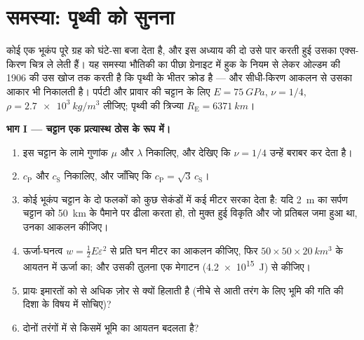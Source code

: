 \section{समस्या: पृथ्वी को सुनना}

\begin{problem}[{सप्ताहांत समस्या --- भूकंपों ने द्रव क्रोड कैसे
उजागर किया}]\label{pb:b3:continuum-elasticity:1}
कोई एक भूकंप पूरे ग्रह को घंटे-सा बजा देता है, और इस अध्याय की दो
 उसे पार करती हुई उसका एक्स-किरण चित्र ले लेती हैं।
यह समस्या भौतिकी का पीछा ग्रेनाइट में हुक के नियम से लेकर ओल्डम की
1906 की उस खोज तक करती है कि पृथ्वी के भीतर क्रोड है --- और सीधी-किरण
आकलन से उसका आकार भी निकालती है। पर्पटी और प्रावार की चट्टान के लिए
$E = \qty{75}{GPa}$, $\nu = 1/4$,
$\rho = \qty{2.7e3}{kg/m^3}$ लीजिए; पृथ्वी की त्रिज्या $R_{\text{E}} =
\qty{6371}{km}$।

\medskip\noindent\textbf{भाग I --- चट्टान एक प्रत्यास्थ ठोस के रूप में।}
\begin{enumerate}
  \item इस चट्टान के लामे गुणांक $\mu$ और $\lambda$ निकालिए, और
        देखिए कि $\nu = 1/4$ उन्हें बराबर कर देता है।
  \item $c_{\text{P}}$ और $c_{\text{S}}$ निकालिए, और जाँचिए कि
        $c_{\text{P}} = \sqrt3\,c_{\text{S}}$।
  \item कोई भूकंप चट्टान के दो फलकों को कुछ सेकंडों में कई मीटर सरका
        देता है: यदि \qty{2}{m} का सर्पण चट्टान को \qty{50}{km} के
        पैमाने पर ढीला करता हो, तो मुक्त हुई विकृति और जो प्रतिबल जमा
        हुआ था, उनका आकलन कीजिए।
  \item ऊर्जा-घनत्व $w = \tfrac12 E\varepsilon^2$ से प्रति घन मीटर
         का आकलन कीजिए, फिर
        $50 \times 50 \times \qty{20}{km^3}$ के आयतन में ऊर्जा का;
        और उसकी तुलना एक मेगाटन (\qty{4.2e15}{J}) से कीजिए।
  \item {} प्रायः इमारतों को  से अधिक ज़ोर से क्यों हिलाती
        है (नीचे से आती तरंग के लिए भूमि की गति की दिशा के विषय में
        सोचिए)?
  \item दोनों तरंगों में से किसमें भूमि का आयतन बदलता है?
\end{enumerate}


\end{problem}
